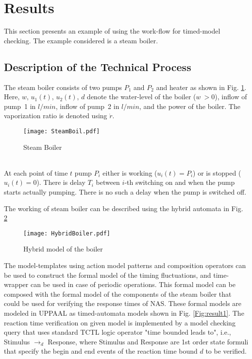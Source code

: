 \documentclass[letterpaper, 10 pt, conference]{ieeeconf}
\begin{document}
\section{Results}
This section presents an example of using the work-flow for timed-model checking. The example considered is a steam boiler.
\subsection{Description of the Technical Process}
The steam boiler consists of two pumps $P_1$ and $P_2$ and heater as shown in Fig. \ref{Fig:SteamBoiler}. Here, $w$, $u_1(t)$, $u_2(t)$, $d$ denote the water-level of the boiler ($w~>0$), inflow of pump~1 in $l/min$, inflow of pump~2 in $l/min$, and the power of the boiler. The vaporization ratio is denoted using $\dot{r}$. 
\begin{figure}[h]
\centering
\texttt{[image: SteamBoil.pdf]}
\caption{Steam Boiler}
\label{Fig:SteamBoiler}
\end{figure}

\\
At each point of time $t$ pump $P_i$ either is working ($u_i(t) = P_i$) or is stopped ($u_i(t) = 0$). There is delay $T_i$ between  $i$-th switching on and when the pump starts actually pumping. There is no such a delay when the pump is switched off.

The working of steam boiler can be described using the hybrid automata in Fig. \ref{Fig:HybBoiler}

\begin{figure}[h]
\centering
\texttt{[image: HybridBoiler.pdf]}
\caption{Hybrid model of the boiler}
\label{Fig:HybBoiler}
\end{figure}

The model-templates using action model patterns and composition operators can be used to construct the formal model of the timing fluctuations, and time-wrapper can be used in case of periodic operations. This formal model can be composed with the formal model of the components of the steam boiler that could be used for verifying the response times of NAS. These formal models are modeled in UPPAAL as timed-automata \cite{Beng2004} models  shown in Fig. \ref{Fig:result1}. The reaction time verification on given model is implemented by a model checking query that uses standard TCTL logic operator "time bounded leads to", i.e.,  Stimulus $\rightarrow_d$ Response, where Stimulus and Response are 1st order state formuli that specify the begin and end events of the reaction time bound $d$ to be verified.
\end{document}
